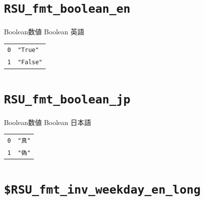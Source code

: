 \section{\texttt{RSU\_fmt\_boolean\_en}}
\paragraph{\DocStrTitleRDMPredefinedFormatConversion}Boolean数値  Boolean 英語
\begin{center}
\begin{xltabular}{\textwidth}{|p{7truecm}|X|}
\hline
\thead{\DocStrHeaderFormatInput}&\thead{\DocStrHeaderFormatOutput}\\
\hline
\hline
\texttt{0}&\texttt{"True"}\\
\hline
\texttt{1}&\texttt{"False"}\\
\hline
\end{xltabular}
\end{center}
\section{\texttt{RSU\_fmt\_boolean\_jp}}
\paragraph{\DocStrTitleRDMPredefinedFormatConversion}Boolean数値  Boolean 日本語
\begin{center}
\begin{xltabular}{\textwidth}{|p{7truecm}|X|}
\hline
\thead{\DocStrHeaderFormatInput}&\thead{\DocStrHeaderFormatOutput}\\
\hline
\hline
\texttt{0}&\texttt{"真"}\\
\hline
\texttt{1}&\texttt{"偽"}\\
\hline
\end{xltabular}
\end{center}
\section{\texttt{\$RSU\_fmt\_inv\_weekday\_en\_long}}

